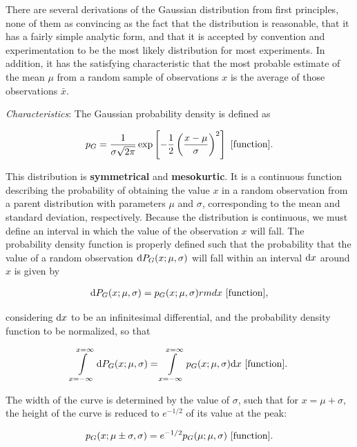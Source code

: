 \documentclass[a4paper,10pt]{article}
\begin{document}
{\noindent}There are several derivations of the Gaussian distribution from first principles, none of them as convincing as the fact that the distribution is reasonable, that it has a fairly simple analytic form, and that it is accepted by convention and experimentation to be the most likely distribution for most experiments. In addition, it has the satisfying characteristic that the most probable estimate of the mean $\mu$ from a random sample of observations $x$ is the average of those observations $\bar{x}$.

{\noindent}\textit{Characteristics}: The Gaussian probability density is defined as

\begin{align*}
    p_G = \frac{1}{\sigma\sqrt{2\pi}}\exp \left[-\frac{1}{2} \left(\frac{x-\mu}{\sigma}\right)^2 \right] ~ [{\rm function}].
\end{align*}

{\noindent}This distribution is \textbf{symmetrical} and \textbf{mesokurtic}. It is a continuous function describing the probability of obtaining the value $x$ in a random observation from a parent distribution with parameters $\mu$ and $\sigma$, corresponding to the mean and standard deviation, respectively. Because the distribution is continuous, we must define an interval in which the value of the observation $x$ will fall. The probability density function is properly defined such that the probability that the value of a random observation ${\rm d}P_G(x;\mu,\sigma)$ will fall within an interval ${\rm d}x$ around $x$ is given by

\begin{align*}
    {\rm d}P_G(x;\mu,\sigma) = p_G(x;\mu,\sigma){rm d}x ~ [{\rm function}],
\end{align*}

{\noindent}considering ${\rm d}x$ to be an infinitesimal differential, and the probability density function to be normalized, so that

\begin{align*}
    \int\limits_{x=-\infty}^{x=\infty} {\rm d}P_G(x;\mu,\sigma) = \int\limits_{x=-\infty}^{x=\infty} p_G(x;\mu,\sigma){\rm d}x ~ [{\rm function}].
\end{align*}

{\noindent}The width of the curve is determined by the value of $\sigma$, such that for $x=\mu+\sigma$, the height of the curve is reduced to $e^{-1/2}$ of its value at the peak:

\begin{align*}
    p_G(x;\mu\pm\sigma,\sigma) = e^{-1/2}p_G(\mu;\mu,\sigma) ~ [{\rm function}].
\end{align*}
\end{document}

